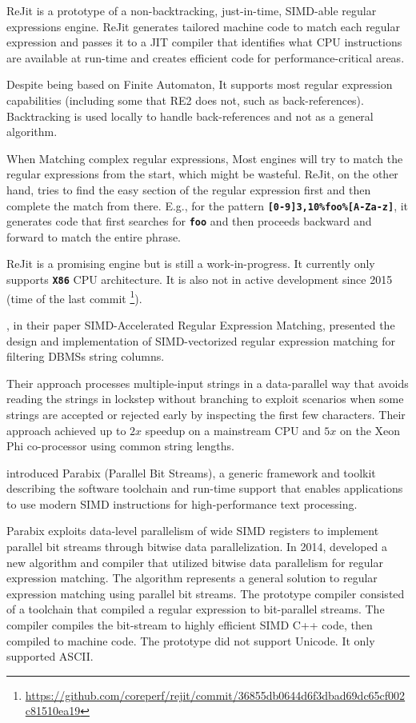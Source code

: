 \newpage
ReJit \cite{rejit} is a prototype of a non-backtracking, just-in-time, SIMD-able regular expressions engine. ReJit generates tailored machine code to match each regular expression and passes it to a JIT compiler that identifies what CPU instructions are available at run-time and creates efficient code for performance-critical areas.

Despite being based on Finite Automaton, It supports most regular expression capabilities (including some that RE2 does not, such as back-references). Backtracking is used locally to handle back-references and not as a general algorithm.

When Matching complex regular expressions, Most engines will try to match the regular expressions from the start, which might be wasteful. ReJit, on the other hand, tries to find the easy section of the regular expression first and then complete the match from there. E.g., for the pattern \texttt{\textbf{[0-9]{3,10}\%foo\%[A-Za-z]}}, it generates code that first searches for \texttt{\textbf{foo}} and then proceeds backward and forward to match the entire phrase.

ReJit is a promising engine but is still a work-in-progress. It currently only supports \texttt{\textbf{X86}} CPU architecture. It is also not in active development since 2015 (time of the last commit \footnote{\url{https://github.com/coreperf/rejit/commit/36855db0644d6f3dbad69dc65cf002c81510ea19}}).

\citet{simdregextpch}, in their paper SIMD-Accelerated Regular Expression Matching, presented the design and implementation of SIMD-vectorized regular expression matching for filtering DBMSs string columns. 

Their approach processes multiple-input strings in a data-parallel way that avoids reading the strings in lockstep without branching to exploit scenarios when some strings are accepted or rejected early by inspecting the first few characters. Their approach achieved up to $2x$ speedup on a mainstream CPU and $5x$ on the Xeon Phi co-processor using common string lengths.

\citet{parabixorg} introduced Parabix (Parallel Bit Streams), a generic framework and toolkit describing the software toolchain and run-time support that enables applications to use modern SIMD instructions for high-performance text processing.

Parabix exploits data-level parallelism of wide SIMD registers to implement parallel bit streams through bitwise data parallelization. In 2014, \citet{parabixregexnew} developed a new algorithm and compiler that utilized bitwise data parallelism for regular expression matching. The algorithm represents a general solution to regular expression matching using parallel bit streams. The prototype compiler consisted of a toolchain that compiled a regular expression to bit-parallel streams. The compiler compiles the bit-stream to highly efficient SIMD C++ code, then compiled to machine code. The prototype did not support Unicode. It only supported ASCII.

